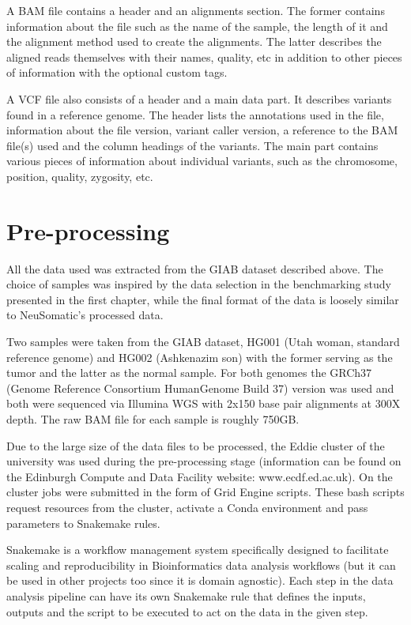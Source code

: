 \documentclass[bsc,frontabs,singlespacing,parskip,deptreport]{infthesis}
\begin{document}
A BAM file contains a header and an alignments section. The former contains information about the file such as the name of the sample, the length of it and the alignment method used to create the alignments. The latter describes the aligned reads themselves with their names, quality, etc in addition to other pieces of information with the optional custom tags.

A VCF file also consists of a header and a main data part. It describes variants found in a reference genome. The header lists the annotations used in the file, information about the file version, variant caller version, a reference to the BAM file(s) used and the column headings of the variants. The main part contains various pieces of information about individual variants, such as the chromosome, position, quality, zygosity, etc.

\section{Pre-processing}

All the data used was extracted from the GIAB dataset described above. The choice of samples was inspired by the data selection in the benchmarking study \cite{benchmark} presented in the first chapter, while the final format of the data is loosely similar to NeuSomatic's \cite{neusomatic} processed data.

Two samples were taken from the GIAB dataset, HG001 (Utah woman, standard reference genome) and HG002 (Ashkenazim son) with the former serving as the tumor and the latter as the normal sample. For both genomes the GRCh37 (Genome Reference Consortium HumanGenome Build 37) version was used and both were sequenced via Illumina WGS with 2x150 base pair alignments at 300X depth. The raw BAM file for each sample is roughly 750GB.

Due to the large size of the data files to be processed, the Eddie cluster of the university was used during the pre-processing stage (information can be found on the Edinburgh Compute and Data Facility website: www.ecdf.ed.ac.uk). On the cluster jobs were submitted in the form of Grid Engine scripts. These bash scripts request resources from the cluster, activate a Conda environment and pass parameters to Snakemake \cite{snakemake} rules.

Snakemake \cite{snakemake} is a workflow management system specifically designed to facilitate scaling and reproducibility in Bioinformatics data analysis workflows (but it can be used in other projects too since it is domain agnostic). Each step in the data analysis pipeline can have its own Snakemake rule that defines the inputs, outputs and the script to be executed to act on the data in the given step.
\end{document}
